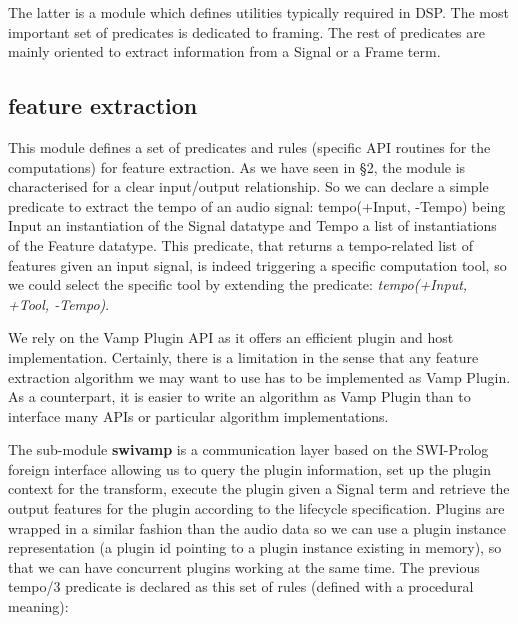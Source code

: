 \documentclass[runningheads]{llncs}
\begin{document}
The latter is a module which defines utilities typically required in DSP. The most important set of predicates is dedicated to framing. The rest of predicates are mainly oriented to extract information from a Signal or a Frame term.

\subsection{feature extraction}\label{subsec:swivamp}

This module defines a set of predicates and rules (specific API routines for the computations) for feature extraction. As we have seen in \S 2, the module is characterised for a clear input/output relationship. So we can declare a simple predicate to extract the tempo of an audio signal: tempo(+Input, -Tempo) being Input an instantiation of the Signal datatype and Tempo a list of instantiations of the Feature datatype. This predicate, that returns a tempo-related list of features given an input signal, is indeed triggering a specific computation tool, so we could select the specific tool by extending the predicate: \textit{tempo(+Input, +Tool, -Tempo)}.

We rely on the Vamp Plugin API as it offers an efficient plugin and host implementation. Certainly, there is a limitation in the sense that any feature extraction algorithm we may want to use has to be implemented as Vamp Plugin. As a counterpart, it is easier to write an algorithm as Vamp Plugin than to interface many APIs or particular algorithm implementations.

The sub-module \textbf{swivamp} is a communication layer based on the SWI-Prolog foreign interface allowing us to query the plugin information, set up the plugin context for the transform, execute the plugin given a Signal term and retrieve the output features for the plugin according to the lifecycle specification. Plugins are wrapped in a similar fashion than the audio data so we can use a plugin instance representation (a plugin id pointing to a plugin instance existing in memory), so that we can have concurrent plugins working at the same time. The previous tempo/3 predicate is declared as this set of rules (defined with a procedural meaning):
\end{document}
